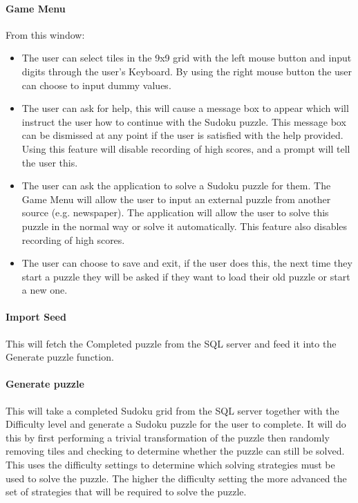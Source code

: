 \documentclass[fleqn]{article}
\begin{document}
\paragraph{Game Menu}
From this window:
\begin{itemize}
\item The user can select tiles in the 9x9 grid with the left mouse button and input digits through the user's Keyboard. By using the right mouse button the user can choose to input dummy values.
\item The user can ask for help, this will cause a message box to appear which will instruct the user how to continue with the Sudoku puzzle. This message box can be dismissed at any point if the user is satisfied with the help provided. Using this feature will disable recording of high scores, and a prompt will tell the user this.
\item The user can ask the application to solve a Sudoku puzzle for them. The Game Menu will allow the user to input an external puzzle from another source (e.g. newspaper). The application will allow the user to solve this puzzle in the normal way or solve it automatically. This feature also disables recording of high scores.
\item The user can choose to save and exit, if the user does this, the next time they start a puzzle they will be asked if they want to load their old puzzle or start a new one.
\end{itemize}

\paragraph{Import Seed}
This will fetch the Completed puzzle from the SQL server and feed it into the Generate puzzle function.


\paragraph{Generate puzzle}
This will take a completed Sudoku grid from the SQL server together with the Difficulty level and generate a Sudoku puzzle for the user to complete. It will do this by first performing a trivial transformation of the puzzle then randomly removing tiles and checking to determine whether the puzzle can still be solved. This uses the difficulty settings to determine which solving strategies must be used to solve the puzzle. The higher the difficulty setting the more advanced the set of strategies that will be required to solve the puzzle.
\end{document}
